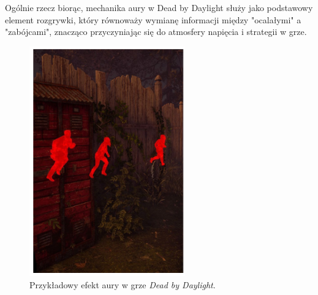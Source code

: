 Ogólnie rzecz biorąc, mechanika aury w Dead by Daylight służy jako podstawowy element rozgrywki,
który równoważy wymianę informacji między "ocalałymi" a "zabójcami", znacząco przyczyniając się do atmosfery napięcia i strategii w grze.

\begin{figure}[h]
\centering
\includegraphics[width=0.6\textwidth]{images/dbd}
\caption{Przykładowy efekt aury w grze \textit{Dead by Daylight}.}
\end{figure}
